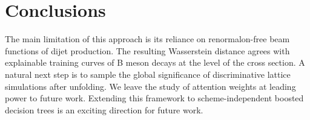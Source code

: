 \section{Conclusions}\label{sec:conclusions}

The main limitation of this approach is its reliance on renormalon-free
beam functions of dijet production. The resulting Wasserstein distance
agrees with explainable training curves of B meson decays at the level
of the cross section. A natural next step is to sample the global
significance of discriminative lattice simulations after unfolding. We
leave the study of attention weights at leading power to future work.
Extending this framework to scheme-independent boosted decision trees is
an exciting direction for future work.

